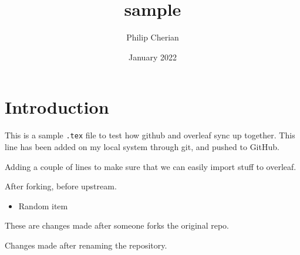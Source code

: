 \documentclass{article}
\title{sample}
\author{Philip Cherian}
\date{January 2022}
\begin{document}
\maketitle

\section{Introduction}

This is a sample \texttt{.tex} file to test how github and overleaf sync up together. This line has been added on my local system through git, and pushed to GitHub.

Adding a couple of lines to make sure that we can easily import stuff to overleaf.

After forking, before upstream.

\begin{itemize}
\item Random item
\end{itemize}

These are changes made after someone forks the original repo.

Changes made after renaming the repository.
\end{document}
